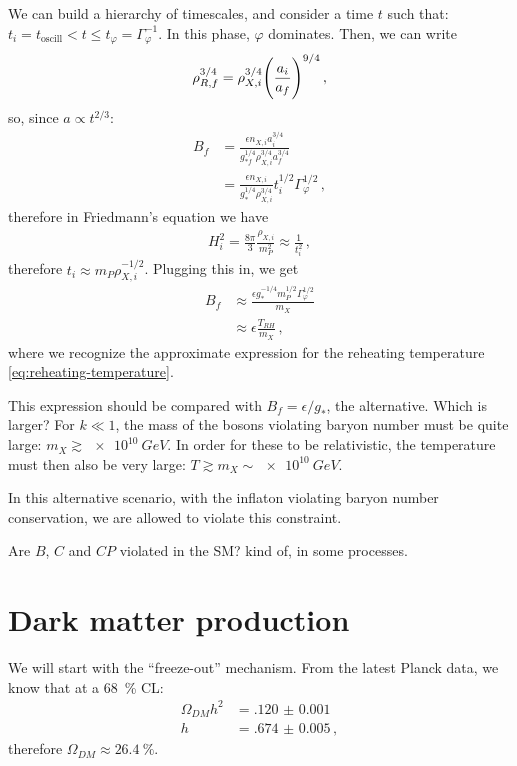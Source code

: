 \documentclass[main.tex]{subfiles}
\begin{document}
We can build a hierarchy of timescales, and consider a time \(t\) such that: \(t_i = t _{\text{oscill}} < t \leq t_\varphi = \Gamma _\varphi^{-1}\). 
In this phase, \(\varphi \) dominates. Then, we can write 
%
\begin{align}
\rho_{R, f}^{3/4} = \rho _{X, i}^{3/4} \qty(\frac{a_i}{a_f})^{9/4}
\,,
\end{align}
%
so, since \(a \propto t^{2/3}\):
%
\begin{align}
B_f &= \frac{\epsilon n_{X, i} a_i^{3/4}}{g_{*f}^{1/4} \rho _{X, i}^{3/4} a_f^{3/4}}  \\
&= \frac{\epsilon n_{X, i}}{g_*^{1/4} \rho _{X, i}^{3/4}} t_i^{1/2} \Gamma _\varphi^{1/2}
\,,
\end{align}
%
therefore in Friedmann's equation we have
%
\begin{align}
H_i^2 = \frac{8 \pi }{3} \frac{\rho_{X,i}}{m_P^2 } \approx \frac{1}{t_i^2}
\,,
\end{align}
%
therefore \(t_i \approx m_P \rho _{X, i}^{-1/2}\).
Plugging this in, we get 
%
\begin{align}
B_f &\approx \frac{\epsilon g_*^{-1/4} m_P^{1/2} \Gamma _\varphi^{1/2}}{m_X}  \\
&\approx \epsilon \frac{T_{RH}}{m_X}
\,,
\end{align}
%
where we recognize the approximate expression for the reheating temperature \eqref{eq:reheating-temperature}.

This expression should be compared with \(B_f = \epsilon / g_*\), the alternative. Which is larger?
For \(k \ll 1\), the mass of the bosons violating baryon number must be quite large: \(m_X \gtrsim \SI{e10}{GeV}\). 
In order for these to be relativistic, the temperature must then also be very large: \(T \gtrsim m_X \sim \SI{e10}{GeV}\). 

In this alternative scenario, with the inflaton violating baryon number conservation, we are allowed to violate this constraint. 

Are \(B\), \(C\) and \(CP\) violated in the SM? kind of, in some processes. 

\section{Dark matter production}

We will start with the ``freeze-out'' mechanism. 
From the latest Planck data, we know that at a \SI{68}{\percent} CL:
%
\begin{align}
\Omega_{DM} h^2 &= \num{.120(1)}   \\
h &= \num{.674(5)}
\,,
\end{align}
%
therefore \(\Omega_{DM} \approx \SI{26.4}{\percent}\).
\end{document}
